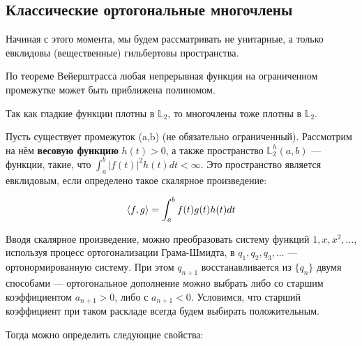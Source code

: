 \documentclass[12pt]{article}
\begin{document}
	\subsection{Классические ортогональные многочлены}

		Начиная с этого момента, мы будем рассматривать не унитарные, а только евклидовы (вещественные)
		гильбертовы пространства.

		По теореме Вейерштрасса любая непрерывная функция на ограниченном промежутке может быть
		приближена полиномом.

		Так как гладкие функции плотны в $\mathbb{L}_2$, то многочлены тоже плотны в $\mathbb{L}_2$.
	
		Пусть существует промежуток (a,b) (не обязательно ограниченный). Рассмотрим на нём
		\textbf{весовую функцию} $h(t) > 0$, а также пространство $\mathbb{L}_2^h (a,b)$ --- функции,
		такие, что $\int_a^b |f(t)|^2 h(t) dt < \infty$. Это пространство является евклидовым, если
		определено такое скалярное произведение:
			
		$$ \left\langle f, g \right\rangle = \int_a^b f(t) g(t) h(t) dt $$
	

		Вводя скалярное произведение, можно преобразовать систему функций $1, x, x^2, \ldots$, используя
		процесс ортогонализации Грама-Шмидта, в $q_1, q_2, q_3, \ldots$ --- ортонормированную систему.
		При этом $q_{n+1}$ восстанавливается из $ \{ q_n \} $ двумя способами --- ортогональное
		дополнение можно выбрать либо со старшим коэффициентом $a_{n+1} > 0$, либо с $a_{n+1} < 0$.
		Условимся, что старший коэффициент при таком раскладе всегда будем выбирать положительным.

		Тогда можно определить следующие свойства:
\end{document}
